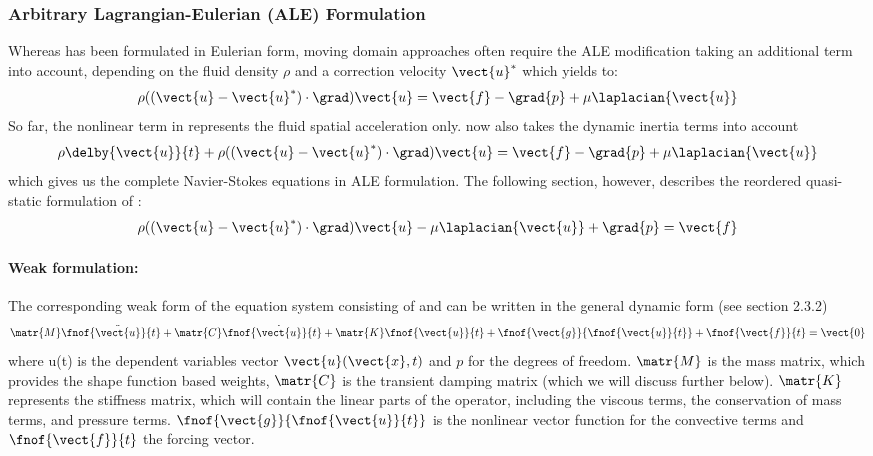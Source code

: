 \subsubsection{Arbitrary Lagrangian-Eulerian (ALE) Formulation}
Whereas  has been formulated in Eulerian form, moving domain approaches often require the ALE modification taking an additional term into account, depending on the fluid density $\rho$ and a correction velocity $\vect{u}^*$ which yields to:
\begin{equation}
    \rho((\vect{u}-\vect{u}^*)\cdot\grad)\vect{u}=\vect{f}-\grad{p}+\mu\laplacian{\vect{u}}
  \label{eqn:NavierStokesequationALE}
\end{equation}
So far, the nonlinear term in  represents the fluid spatial acceleration only.  now also takes the dynamic inertia terms into account
\begin{equation}
    \rho\delby{\vect{u}}{t}+ \rho((\vect{u}-\vect{u}^*)\cdot\grad)\vect{u}=\vect{f}-\grad{p}+\mu\laplacian{\vect{u}}
  \label{eqn:NavierStokesequation2}
\end{equation}
which gives us the complete Navier-Stokes equations in ALE formulation.
The following section, however, describes the reordered quasi-static formulation of  :
\begin{equation}
\rho((\vect{u}-\vect{u}^*)\cdot\grad)\vect{u}-\mu\laplacian{\vect{u}}+\grad{p}=\vect{f}
  \label{eqn:NavierStokesequationALE2}
\end{equation}

\paragraph{Weak formulation:}

The corresponding weak form of the equation system consisting of  and  can be written in the general dynamic form (see section 2.3.2)
\begin{equation}
  \matr{M}\fnof{\ddot{\vect{u}}}{t}+\matr{C}\fnof{\dot{\vect{u}}}{t}+\matr{K}\fnof{\vect{u}}{t}+
  \fnof{\vect{g}}{\fnof{\vect{u}}{t}}+\fnof{\vect{f}}{t}=\vect{0}
  \label{eqn:generaldynamicnonlinear}
\end{equation}
where u(t) is the dependent variables vector $\vect{u}(\vect{x},t)$ and $p$ for the degrees of freedom. $\matr{M}$ is the mass matrix, which provides the shape function based weights, $\matr{C}$ is the transient damping matrix (which we will discuss further below). $\matr{K}$ represents the stiffness matrix, which will contain the linear parts of the operator, including the viscous terms, the conservation of mass terms, and pressure terms. $\fnof{\vect{g}}{\fnof{\vect{u}}{t}}$ is the nonlinear vector function for the convective terms and $\fnof{\vect{f}}{t}$ the forcing vector. 

